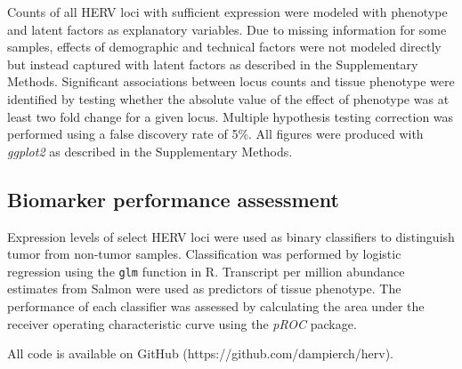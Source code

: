 Counts of all HERV loci with sufficient expression were modeled with phenotype and latent factors as explanatory variables.
Due to missing information for some samples, effects of demographic and technical factors were not modeled directly but instead captured with latent factors as described in the Supplementary Methods.
Significant associations between locus counts and tissue phenotype were identified by testing whether the absolute value of the effect of phenotype was at least two fold change for a given locus.
Multiple hypothesis testing correction was performed using a false discovery rate of 5\%.
All figures were produced with \emph{ggplot2} \citep{Wickham2016} as described in the Supplementary Methods.

\subsection*{Biomarker performance assessment}
Expression levels of select HERV loci were used as binary classifiers to distinguish tumor from non-tumor samples.
Classification was performed by logistic regression using the \verb|glm| function in R.
Transcript per million abundance estimates from Salmon were used as predictors of tissue phenotype.
The performance of each classifier was assessed by calculating the area under the receiver operating characteristic curve using the \emph{pROC} \citep{pROC} package.

All code is available on GitHub (https://github.com/dampierch/herv).
